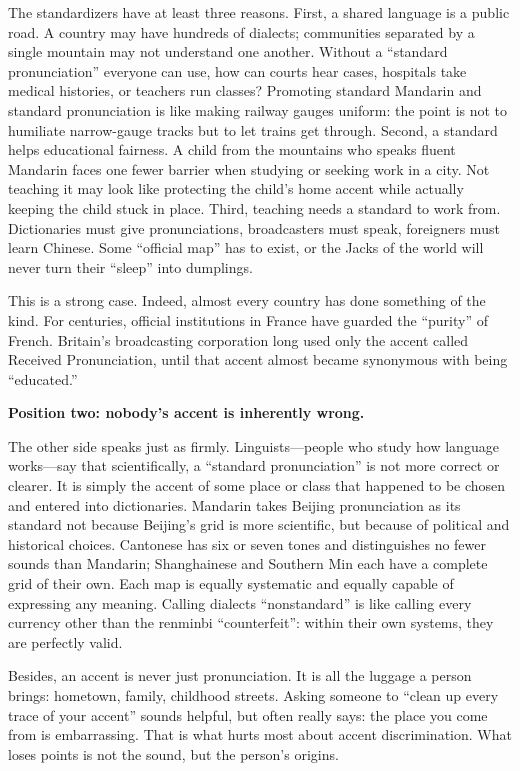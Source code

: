 The standardizers have at least three reasons. First, a shared language is a public road. A country may have hundreds of dialects; communities separated by a single mountain may not understand one another. Without a ``standard pronunciation'' everyone can use, how can courts hear cases, hospitals take medical histories, or teachers run classes? Promoting standard Mandarin and standard pronunciation is like making railway gauges uniform: the point is not to humiliate narrow-gauge tracks but to let trains get through. Second, a standard helps educational fairness. A child from the mountains who speaks fluent Mandarin faces one fewer barrier when studying or seeking work in a city. Not teaching it may look like protecting the child's home accent while actually keeping the child stuck in place. Third, teaching needs a standard to work from. Dictionaries must give pronunciations, broadcasters must speak, foreigners must learn Chinese. Some ``official map'' has to exist, or the Jacks of the world will never turn their ``sleep'' into dumplings.

This is a strong case. Indeed, almost every country has done something of the kind. For centuries, official institutions in France have guarded the ``purity'' of French. Britain's broadcasting corporation long used only the accent called Received Pronunciation, until that accent almost became synonymous with being ``educated.''

\textbf{Position two: nobody's accent is inherently wrong.}

The other side speaks just as firmly. Linguists---people who study how language works---say that scientifically, a ``standard pronunciation'' is not more correct or clearer. It is simply the accent of some place or class that happened to be chosen and entered into dictionaries. Mandarin takes Beijing pronunciation as its standard not because Beijing's grid is more scientific, but because of political and historical choices. Cantonese has six or seven tones and distinguishes no fewer sounds than Mandarin; Shanghainese and Southern Min each have a complete grid of their own. Each map is equally systematic and equally capable of expressing any meaning. Calling dialects ``nonstandard'' is like calling every currency other than the renminbi ``counterfeit'': within their own systems, they are perfectly valid.

Besides, an accent is never just pronunciation. It is all the luggage a person brings: hometown, family, childhood streets. Asking someone to ``clean up every trace of your accent'' sounds helpful, but often really says: the place you come from is embarrassing. That is what hurts most about accent discrimination. What loses points is not the sound, but the person's origins.

